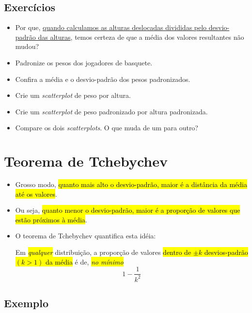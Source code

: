 \documentclass[
  11pt]{report}
\begin{document}
\hypertarget{exercuxedcios-10}{%
\subsection{Exercícios}\label{exercuxedcios-10}}

\begin{itemize}
\item
  Por que, \protect\hyperlink{dividir-por-sd}{quando calculamos as alturas deslocadas divididas pelo desvio-padrão das alturas}, temos certeza de que a média dos valores resultantes não mudou?
\item
  Padronize os pesos dos jogadores de basquete.
\item
  Confira a média e o desvio-padrão dos pesos padronizados.
\item
  Crie um \emph{scatterplot} de peso por altura.
\item
  Crie um \emph{scatterplot} de peso padronizado por altura padronizada.
\item
  Compare os dois \emph{scatterplots}. O que muda de um para outro?
\end{itemize}

\hypertarget{teorema-de-tchebychev}{%
\section{Teorema de Tchebychev}\label{teorema-de-tchebychev}}

\begin{itemize}
\item
  Grosso modo, {\hl{quanto mais alto o desvio-padrão, maior é a distância da média até os valores}}.
\item
  Ou seja, {\hl{quanto menor o desvio-padrão, maior é a proporção de valores que estão próximos à média}}.
\item
  O teorema de Tchebychev quantifica esta idéia:

  Em {\hl{\emph{qualquer}}} distribuição, a proporção de valores {\hl{dentro de $\pm k$ desvios-padrão $(k > 1)$ da média}} é de, {\hl{\emph{no mínimo}}}
  \[
  1 - \frac{1}{k^2}
  \]
\end{itemize}

\hypertarget{exemplo-2}{%
\subsection{Exemplo}\label{exemplo-2}}
\end{document}
